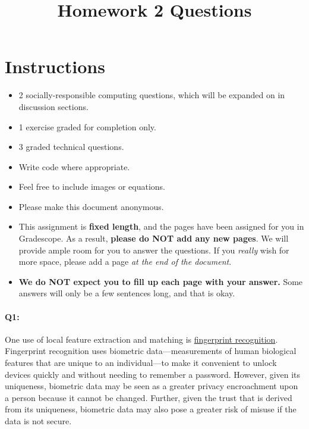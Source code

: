 \date{}

\title{\vspace{-1cm}Homework 2 Questions}



\maketitle
\vspace{-3cm}
\thispagestyle{fancy}

\section*{Instructions}
\begin{itemize}
  \item 2 socially-responsible computing questions, which will be expanded on in discussion sections.
  \item 1 exercise graded for completion only.
  \item 3 graded technical questions.
  \item Write code where appropriate.
  \item Feel free to include images or equations.
  \item Please make this document anonymous.
  \item This assignment is \textbf{fixed length}, and the pages have been assigned for you in Gradescope. As a result, \textbf{please do NOT add any new pages}. We will provide ample room for you to answer the questions. If you \emph{really} wish for more space, please add a page \emph{at the end of the document}.
  \item \textbf{We do NOT expect you to fill up each page with your answer.} Some answers will only be a few sentences long, and that is okay.
\end{itemize}
\pagebreak

\paragraph{Q1:} One use of local feature extraction and matching is \href{https://www.youtube.com/watch?v=xD88Qs_DZp4}{fingerprint recognition}. Fingerprint recognition uses biometric data---measurements of human biological features that are unique to an individual---to make it convenient to unlock devices quickly and without needing to remember a password. However, given its uniqueness, biometric data may be seen as a greater privacy encroachment upon a person because it cannot be changed. Further, given the trust that is derived from its uniqueness, biometric data may also pose a greater risk of misuse if the data is not secure.

